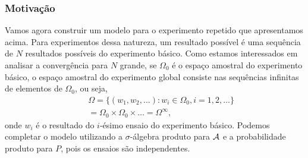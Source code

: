 \begin{frame}
\frametitle{\textbf{Motivação}}
\baselineskip=13pt
\begin{block}{}


Vamos agora construir um modelo para o experimento repetido que
apresentamos acima. Para experimentos dessa natureza, um resultado
possível é uma sequência de $N$ resultados possíveis do experimento
básico. Como estamos interessados em analisar a convergência para
$N$ grande, se $\Omega_0$ é o espaço amostral do experimento básico,
o espaço amostral do experimento global consiste nas sequências
infinitas de elementos de $\Omega_0$, ou seja,
\begin{eqnarray}
&  & \Omega=\{(w_1,w_2,\ldots):w_i\in\Omega_0,i=1,2,\ldots\}\nonumber\\
& & =\Omega_0\times\Omega_0\times\ldots=\Omega^{\infty},
\nonumber
\end{eqnarray}
onde $w_i$ é o resultado do $i$-ésimo ensaio do experimento básico.
Podemos completar o modelo utilizando a $\sigma$-álgebra produto
para ${\cal A}$ e a probabilidade produto para $P$,
pois os ensaios são
independentes.


\end{block}
\end{frame}


